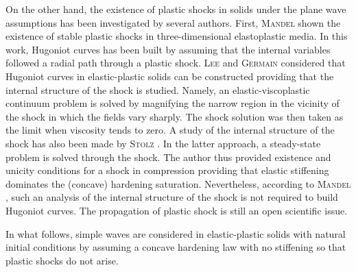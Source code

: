 On the other hand, the existence of plastic shocks in solids under the plane wave assumptions has been investigated by several authors. %
First, \textsc{Mandel} \cite{Mandel1} shown the existence of stable plastic shocks in three-dimensional elastoplastic media.
In this work, Hugoniot curves has been built by assuming that the internal variables followed a radial path through a plastic shock.
\textsc{Lee} and \textsc{Germain} \cite{Germain_shock} considered that Hugoniot curves in elastic-plastic solids can be constructed providing that the internal structure of the shock is studied.
Namely, an elastic-viscoplastic continuum problem is solved by magnifying the narrow region in the vicinity of the shock in which the fields vary sharply.
The shock solution was then taken as the limit when viscosity tends to zero.
A study of the internal structure of the shock has also been made by \textsc{Stolz} \cite{Claude}.
In the latter approach, a steady-state problem is solved through the shock.
The author thus provided existence and unicity conditions for a shock in compression providing that elastic stiffening dominates the (concave) hardening saturation.
Nevertheless, according to \textsc{Mandel} \cite{Mandel2}, such an analysis of the internal structure of the shock is not required to build Hugoniot curves.
The propagation of plastic shock is still an open scientific issue.

In what follows, simple waves are considered in elastic-plastic solids with natural initial conditions by assuming a concave hardening law with no stiffening so that plastic shocks do not arise.





